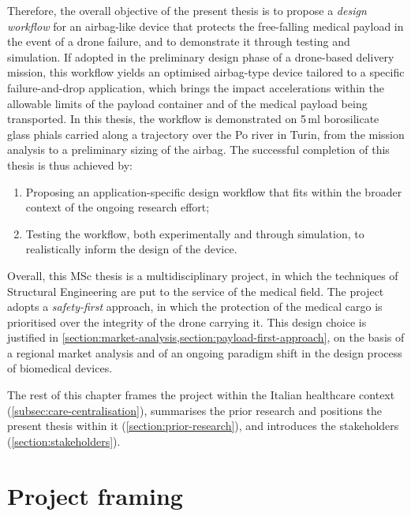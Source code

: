 Therefore, the overall objective of the present thesis is to propose a \textit{design workflow} for an airbag-like device that protects the free-falling medical payload in the event of a drone failure, and to demonstrate it through testing and simulation. If adopted in the preliminary design phase of a drone-based delivery mission, this workflow yields an optimised airbag-type device tailored to a specific failure-and-drop application, which brings the impact accelerations within the allowable limits of the payload container and of the medical payload being transported. In this thesis, the workflow is demonstrated on 5\,ml borosilicate glass phials carried along a trajectory over the Po river in Turin, from the mission analysis to a preliminary sizing of the airbag. The successful completion of this thesis is thus achieved by:
\begin{enumerate}
    \item Proposing an application-specific design workflow that fits within the broader context of the ongoing research effort;
    \item Testing the workflow, both experimentally and through simulation, to realistically inform the design of the device.
\end{enumerate}

Overall, this MSc thesis is a multidisciplinary project, in which the techniques of Structural Engineering are put to the service of the medical field. The project adopts a \textit{safety-first} approach, in which the protection of the medical cargo is prioritised over the integrity of the drone carrying it. This design choice is justified in \cref{section:market-analysis,section:payload-first-approach}, on the basis of a regional market analysis and of an ongoing paradigm shift in the design process of biomedical devices.

The rest of this chapter frames the project within the Italian healthcare context (\cref{subsec:care-centralisation}), summarises the prior research and positions the present thesis within it (\cref{section:prior-research}), and introduces the stakeholders (\cref{section:stakeholders}).


\section{Project framing}

